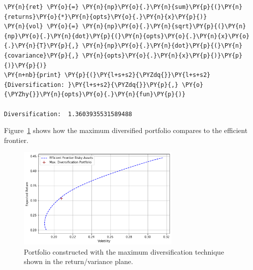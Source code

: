 \begin{tcolorbox}[breakable, size=fbox, boxrule=1pt, pad at break*=1mm,colback=cellbackground, colframe=cellborder]
\begin{Verbatim}[commandchars=\\\{\}]
\PY{n}{ret} \PY{o}{=} \PY{n}{np}\PY{o}{.}\PY{n}{sum}\PY{p}{(}\PY{n}{returns}\PY{o}{*}\PY{n}{opts}\PY{o}{.}\PY{n}{x}\PY{p}{)}
\PY{n}{vol} \PY{o}{=} \PY{n}{np}\PY{o}{.}\PY{n}{sqrt}\PY{p}{(}\PY{n}{np}\PY{o}{.}\PY{n}{dot}\PY{p}{(}\PY{n}{opts}\PY{o}{.}\PY{n}{x}\PY{o}{.}\PY{n}{T}\PY{p}{,} \PY{n}{np}\PY{o}{.}\PY{n}{dot}\PY{p}{(}\PY{n}{covariance}\PY{p}{,} \PY{n}{opts}\PY{o}{.}\PY{n}{x}\PY{p}{)}\PY{p}{)}\PY{p}{)} 
\PY{n+nb}{print} \PY{p}{(}\PY{l+s+s2}{\PYZdq{}}\PY{l+s+s2}{Diversification: }\PY{l+s+s2}{\PYZdq{}}\PY{p}{,} \PY{o}{\PYZhy{}}\PY{n}{opts}\PY{o}{.}\PY{n}{fun}\PY{p}{)}

Diversification:  1.3603935531589488
\end{Verbatim}
\end{tcolorbox}

Figure~\ref{fig:max_div} shows how the maximum diversified portfolio compares to the efficient frontier.

\begin{figure}[htb]
	\centering
	\includegraphics[width=0.7\textwidth]{figures/max_div.png}
	\caption{Portfolio constructed with the maximum diversification technique shown in the return/variance plane.}
	\label{fig:max_div}
\end{figure}
